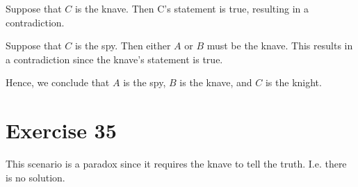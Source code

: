 \documentclass{article}
\begin{document}
Suppose that $C$ is the knave. Then C's statement is true, resulting in a contradiction.

Suppose that $C$ is the spy. Then either $A$ or $B$ must be the knave. This results in a contradiction since the knave's statement is true.

Hence, we conclude that $A$ is the spy, $B$ is the knave, and $C$ is the knight.

\pagebreak

\section{Exercise 35}
This scenario is a paradox since it requires the knave to tell the truth. I.e. there is no solution.
\end{document}
